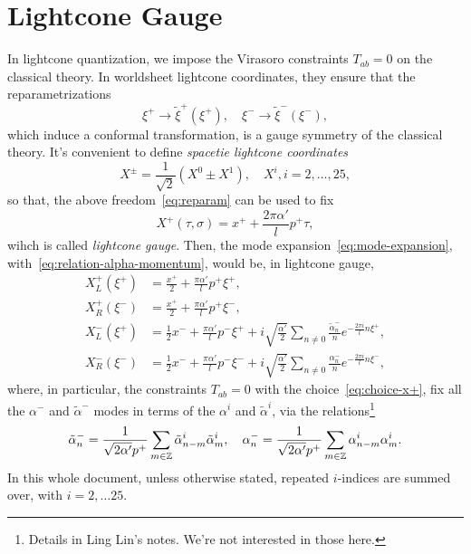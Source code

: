 \section{Lightcone Gauge}
In lightcone quantization, we impose the Virasoro constraints $T_{ab}=0$ on the classical theory. In worldsheet lightcone coordinates, they ensure that the reparametrizations
\begin{equation}\label{eq:reparam}
    \xi^+ \to \tilde{\xi}^+(\xi^+), \quad \xi^- \to \tilde{\xi}^-(\xi^-),
\end{equation}
which induce a conformal transformation, is a gauge symmetry of the classical theory. It's convenient to define \emph{spacetie lightcone coordinates}
\begin{equation}
    X^\pm = \frac{1}{\sqrt{2}}(X^0 \pm X^1), \quad X^i, i = 2, \dots, 25,
\end{equation}
so that, the above freedom~\eqref{eq:reparam} can be used to fix
\begin{equation}\label{eq:choice-x+}
    X^+(\tau,\sigma) = x^+ + \frac{2\pi\alpha'}{l}p^+ \tau ,
\end{equation}
wihch is called \emph{lightcone gauge}. Then, the mode expansion~\eqref{eq:mode-expansion}, with~\eqref{eq:relation-alpha-momentum}, would be, in lightcone gauge,
\begin{subequations}
\begin{align}
    X^+_L(\xi^+) &= \frac{x^+}{2} + \frac{\pi\alpha'}{l}p^+ \xi^+, \\
    X^+_R(\xi^-) &= \frac{x^+}{2} + \frac{\pi\alpha'}{l}p^+ \xi^-, \\
    X^-_L(\xi^+) &= \frac{1}{2} x^- + \frac{\pi\alpha'}{l} p^- \xi^+ + i \sqrt{\frac{\alpha'}{2}} \sum_{n\neq 0}\frac{\tilde{\alpha}^-_n}{n} e^{-\frac{2\pi i}{l}n \xi^+}, \\
    X^-_R(\xi^-) &=\frac{1}{2} x^- + \frac{\pi\alpha'}{l} p^- \xi^- + i \sqrt{\frac{\alpha'}{2}} \sum_{n\neq 0}\frac{{\alpha}^-_n}{n} e^{-\frac{2\pi i}{l}n \xi^-},
\end{align}
\end{subequations}
where, in particular, the constraints $T_{ab}=0$ with the choice~\eqref{eq:choice-x+}, fix all the $\alpha^-$ and $\tilde{\alpha}^-$ modes in terms of the $\alpha^i$ and $\tilde{\alpha}^i$, via the relations\footnote{Details in Ling Lin's notes. We're not interested in those here.}
\begin{equation}\label{eq:relation-alpha--}
    \tilde{\alpha}^-_n = \frac{1}{\sqrt{2\alpha'}p^+} \sum_{m \in \mathbb{Z}} \tilde{\alpha}^i_{n-m} \tilde{\alpha}^i_m, \quad {\alpha}^-_n = \frac{1}{\sqrt{2\alpha'}p^+} \sum_{m \in \mathbb{Z}} {\alpha}^i_{n-m} {\alpha}^i_m .
\end{equation}
In this whole document, unless otherwise stated, repeated $i$-indices are summed over, with $i=2, \dots 25$.

